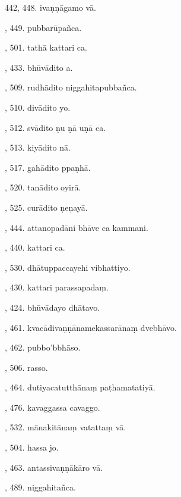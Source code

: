442, 448. ivaṇṇāgamo vā.\hfill \pageref{sut:442}\par {}, 449. pubbarūpañca.\hfill \pageref{sut:443}\par {}, 501. tathā kattari ca.\hfill \pageref{sut:444}\par {}, 433. bhūvādito a.\hfill \pageref{sut:445}\par {}, 509. rudhādito niggahitapubbañca.\hfill \pageref{sut:446}\par {}, 510. divādito yo.\hfill \pageref{sut:447}\par {}, 512. svādito ṇu ṇā uṇā ca.\hfill \pageref{sut:448}\par {}, 513. kiyādito nā.\hfill \pageref{sut:449}\par {}, 517. gahādito ppaṇhā.\hfill \pageref{sut:450}\par {}, 520. tanādito oyirā.\hfill \pageref{sut:451}\par {}, 525. curādito ṇeṇayā.\hfill \pageref{sut:452}\par {}, 444. attanopadāni bhāve ca kammani.\hfill \pageref{sut:453}\par {}, 440. kattari ca.\hfill \pageref{sut:454}\par {}, 530. dhātuppaccayehi vibhattiyo.\hfill \pageref{sut:455}\par {}, 430. kattari parassapadaṃ.\hfill \pageref{sut:456}\par {}, 424. bhūvādayo dhātavo.\hfill \pageref{sut:457}\par {}, 461. kvacādivaṇṇānamekassarānaṃ dvebhāvo.\hfill \pageref{sut:458}\par {}, 462. pubbo’bbhāso.\hfill \pageref{sut:459}\par {}, 506. rasso.\hfill \pageref{sut:460}\par {}, 464. dutiyacatutthānaṃ paṭhamatatiyā.\hfill \pageref{sut:461}\par {}, 476. kavaggassa cavaggo.\hfill \pageref{sut:462}\par {}, 532. mānakitānaṃ vatattaṃ vā.\hfill \pageref{sut:463}\par {}, 504. hassa jo.\hfill \pageref{sut:464}\par {}, 463. antassivaṇṇākāro vā.\hfill \pageref{sut:465}\par {}, 489. niggahitañca.\hfill \pageref{sut:466}\par \noindent
